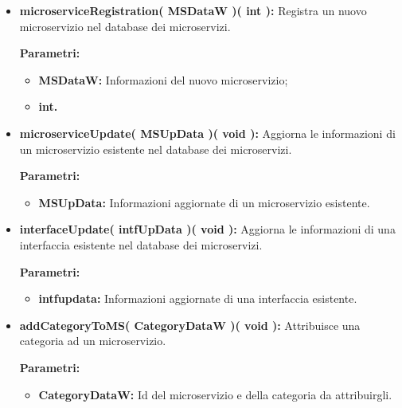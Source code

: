 \begin{itemize}
\begin{itemize}
			\item \textbf{microserviceRegistration( MSDataW )( int ):} Registra un nuovo microservizio nel database dei microservizi.
			\begin{description}
				\item[\textbf{Parametri:}]
			\end{description}
			\begin{itemize}
				\item \textbf{MSDataW:} Informazioni del nuovo microservizio;
				\item \textbf{int.}
			\end{itemize}
			
			\item \textbf{microserviceUpdate( MSUpData )( void ):} Aggiorna le informazioni di un microservizio esistente nel database dei microservizi.
			\begin{description}
				\item[\textbf{Parametri:}]
			\end{description}
			\begin{itemize}
				\item \textbf{MSUpData:} Informazioni aggiornate di un microservizio esistente.
			\end{itemize}
			
			\item \textbf{interfaceUpdate( intfUpData )( void ):} Aggiorna le informazioni di una interfaccia esistente nel database dei microservizi.
			\begin{description}
				\item[\textbf{Parametri:}]
			\end{description}
			\begin{itemize}
				\item \textbf{intfupdata:} Informazioni aggiornate di una interfaccia esistente.
			\end{itemize}
			
			\item \textbf{addCategoryToMS( CategoryDataW )( void ):} Attribuisce una categoria ad un microservizio.
			\begin{description}
				\item[\textbf{Parametri:}]
			\end{description}
			\begin{itemize}
				\item \textbf{CategoryDataW:} Id del microservizio e della categoria da attribuirgli.
			\end{itemize}
		

\end{itemize}
\end{itemize}

